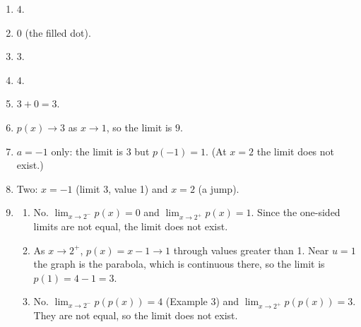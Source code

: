 \documentclass[11pt]{article}
\begin{document}
\newpage
\begin{solbox}
\begin{enumerate}[leftmargin=*,itemsep=4pt]
  \item $4$.
  \item $0$ (the filled dot).
  \item $3$.
  \item $4$.
  \item $3+0=3$.
  \item $p(x)\to3$ as $x\to1$, so the limit is $9$.
  \item $a=-1$ only: the limit is 3 but $p(-1)=1$. (At $x=2$ the limit does not exist.)
  \item Two: $x=-1$ (limit 3, value 1) and $x=2$ (a jump).
  \item \begin{enumerate}[label=(\alph*),leftmargin=*,itemsep=3pt]
    \item No. $\displaystyle\lim_{x\to 2^-}p(x)=0$ and $\displaystyle\lim_{x\to 2^+}p(x)=1$. Since the one-sided limits are not equal, the limit does not exist.
    \item As $x\to2^+$, $p(x)=x-1\to1$ through values greater than 1. Near $u=1$ the graph is the parabola, which is continuous there, so the limit is $p(1)=4-1=3$.
    \item No. $\displaystyle\lim_{x\to 2^-}p(p(x))=4$ (Example 3) and $\displaystyle\lim_{x\to 2^+}p(p(x))=3$. They are not equal, so the limit does not exist.
  \end{enumerate}
\end{enumerate}
\end{solbox}
\end{document}
